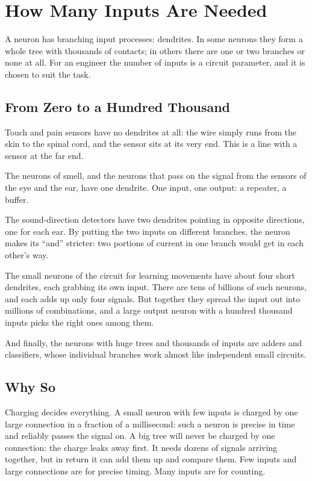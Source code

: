 \chapter{How Many Inputs Are Needed}

A neuron has branching input processes: dendrites. In some neurons they form a whole tree with thousands of contacts; in others there are one or two branches or none at all. For an engineer the number of inputs is a circuit parameter, and it is chosen to suit the task.

\section*{From Zero to a Hundred Thousand}

Touch and pain sensors have no dendrites at all: the wire simply runs from the skin to the spinal cord, and the sensor sits at its very end. This is a line with a sensor at the far end.


The neurons of smell, and the neurons that pass on the signal from the sensors of the eye and the ear, have one dendrite. One input, one output: a repeater, a buffer.

The sound-direction detectors have two dendrites pointing in opposite directions, one for each ear. By putting the two inputs on different branches, the neuron makes its ``and'' stricter: two portions of current in one branch would get in each other's way.

The small neurons of the circuit for learning movements have about four short dendrites, each grabbing its own input. There are tens of billions of such neurons, and each adds up only four signals. But together they spread the input out into millions of combinations, and a large output neuron with a hundred thousand inputs picks the right ones among them.

And finally, the neurons with huge trees and thousands of inputs are adders and classifiers, whose individual branches work almost like independent small circuits.

\section*{Why So}

Charging decides everything. A small neuron with few inputs is charged by one large connection in a fraction of a millisecond: such a neuron is precise in time and reliably passes the signal on. A big tree will never be charged by one connection: the charge leaks away first. It needs dozens of signals arriving together, but in return it can add them up and compare them. Few inputs and large connections are for precise timing. Many inputs are for counting.

